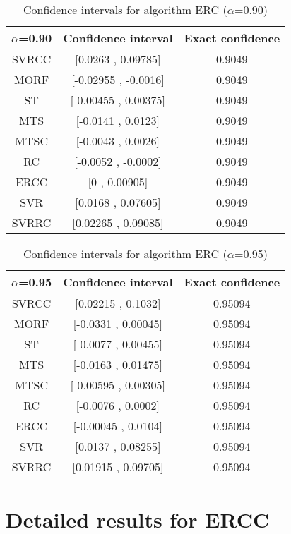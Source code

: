 \documentclass[a4paper,10pt]{article}
\begin{document}
\begin{table}[!htp]
\centering\small
\begin{tabular}{
|c|c|c|}
\hline
 $\alpha$=0.90 & Confidence interval & Exact confidence \\ \hline 
SVRCC & [0.0263 , 0.09785] & 0.9049\\ \hline 
MORF & [-0.02955 , -0.0016] & 0.9049\\ \hline 
ST & [-0.00455 , 0.00375] & 0.9049\\ \hline 
MTS & [-0.0141 , 0.0123] & 0.9049\\ \hline 
MTSC & [-0.0043 , 0.0026] & 0.9049\\ \hline 
RC & [-0.0052 , -0.0002] & 0.9049\\ \hline 
ERCC & [0 , 0.00905] & 0.9049\\ \hline 
SVR & [0.0168 , 0.07605] & 0.9049\\ \hline 
SVRRC & [0.02265 , 0.09085] & 0.9049\\ \hline 

\end{tabular}
\caption{Confidence intervals for algorithm ERC ($\alpha$=0.90)}
\end{table}
\begin{table}[!htp]
\centering\small
\begin{tabular}{
|c|c|c|}
\hline
 $\alpha$=0.95 & Confidence interval & Exact confidence \\ \hline 
SVRCC & [0.02215 , 0.1032] & 0.95094\\ \hline 
MORF & [-0.0331 , 0.00045] & 0.95094\\ \hline 
ST & [-0.0077 , 0.00455] & 0.95094\\ \hline 
MTS & [-0.0163 , 0.01475] & 0.95094\\ \hline 
MTSC & [-0.00595 , 0.00305] & 0.95094\\ \hline 
RC & [-0.0076 , 0.0002] & 0.95094\\ \hline 
ERCC & [-0.00045 , 0.0104] & 0.95094\\ \hline 
SVR & [0.0137 , 0.08255] & 0.95094\\ \hline 
SVRRC & [0.01915 , 0.09705] & 0.95094\\ \hline 

\end{tabular}
\caption{Confidence intervals for algorithm ERC ($\alpha$=0.95)}
\end{table}

 \clearpage 


\section{Detailed results for ERCC}
\end{document}
